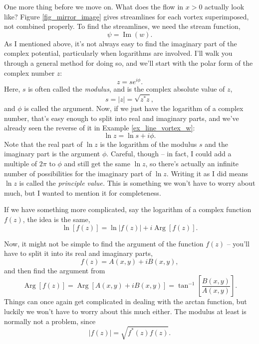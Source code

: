 One more thing before we move on.  What does the flow in $x>0$ actually look like?  Figure \ref{fig_mirror_image} gives streamlines for each vortex superimposed, not combined properly.  To find the streamlines, we need the stream function,
\[
\psi = \operatorname{Im}(w).
\]
As I mentioned above, it's not always easy to find the imaginary part of the complex potential, particularly when logarithms are involved.  I'll walk you through a general method for doing so, and we'll start with the polar form of the complex number $z$:
\[
z = s e^{i\phi}.
\]
Here, $s$ is often called the \emph{modulus}, and is the complex absolute value of $z$,
\[
s = |z| = \sqrt{z^*z},
\]
and $\phi$ is called the argument.  Now, if we just have the logarithm of a complex number, that's easy enough to split into real and imaginary parts, and we've already seen the reverse of it in Example \ref{ex_line_vortex_w}:
\[
\ln z = \ln s + i\phi.
\]
Note that the real part of $\ln z$ is the logarithm of the modulus $s$ and the imaginary part is the argument $\phi$.  Careful, though -- in fact, I could add a multiple of $2\pi$ to $\phi$ and still get the same $\ln z$, so there's actually an infinite number of possibilities for the imaginary part of $\ln z$.  Writing it as I did means $\ln z$ is called the \emph{principle value.} This is something we won't have to worry about much, but I wanted to mention it for completeness. 

If we have something more complicated, say the logarithm of a complex function $f(z)$, the idea is the same,
\[
\ln \left[ f(z) \right] = \ln \left| f(z) \right| + i \operatorname{Arg} \left[ f(z) \right].
\]

Now, it might not be simple to find the argument of the function $f(z)$ -- you'll have to split it into its real and imaginary parts, 
\[
f(z) = A(x, y) + iB(x, y),
\]
and then find the argument from
\[
\operatorname{Arg}\left[ f(z) \right] = \operatorname{Arg}\left[ A(x, y) + iB(x, y) \right] = \tan^{-1} \left[ \frac{B(x,y)}{A(x,y)} \right].
\]
Things can once again get complicated in dealing with the arctan function, but luckily we won't have to worry about this much either.  The modulus at least is normally not a problem, since
\begin{equation}
\left| f(z) \right| = \sqrt{ f^*(z) f(z) }.
\end{equation}

